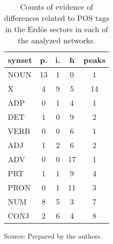 \begin{table}[h!]
\begin{center}
\caption{Counts of evidence of differences related to POS tags in the Erd\"os sectors in each of the analyzed networks.}
\begin{tabular}{| l || c | c | c || c |}\hline
{\bf synset} & {\bf p.} & {\bf i.} & {\bf h} & {\bf peaks} \\\hline\hline
NOUN & 13  & 1  & 0  & 1 \\
X & 4  & 9  & 5  & 14 \\\hline
ADP & 0  & 1  & 4  & 1 \\
DET & 1  & 0  & 9  & 2 \\\hline
VERB & 0  & 0  & 6  & 1 \\\hline
ADJ & 1  & 2  & 6  & 2 \\
ADV & 0  & 0  & 17  & 1 \\\hline
PRT & 1  & 1  & 9  & 4 \\
PRON & 0  & 1  & 11  & 3 \\
NUM & 8  & 5  & 3  & 7 \\
CONJ & 2  & 6  & 4  & 8 \\\hline
\end{tabular}
\begin{flushleft}
		Source: Prepared by the authors.\
\end{flushleft}
\end{center}
\end{table}

